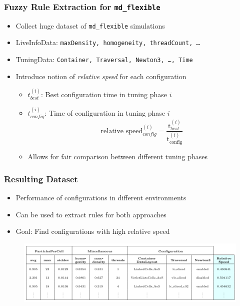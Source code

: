 \documentclass[
	10pt,
	t		%
]{beamer}
\begin{document}
\begin{frame}
	\frametitle{Fuzzy Rule Extraction for \texttt{md\_flexible}}

	\begin{itemize}
		\item Collect huge dataset of \texttt{md\_flexible} simulations
		\item LiveInfoData: {\small \texttt{maxDensity, homogeneity, threadCount, \dots} }
		\item TuningData: {\small \texttt{Container, Traversal, Newton3, \dots, Time} }
		\item Introduce notion of \textit{relative speed} for each configuration
		      \begin{itemize}
			      \item $t_{best}^{(i)}$: Best configuration time in tuning phase $i$
			      \item $t_{config}^{(i)}$: Time of configuration in tuning phase $i$
			            \[ \text{relative speed}_{config}^{(i)} = \frac{\text{t}_{best}^{(i)}}{\text{t}_{\text{config}}^{(i)}} \]
			      \item Allows for fair comparison between different tuning phases
		      \end{itemize}
	\end{itemize}

\end{frame}

\begin{frame}
	\frametitle{Resulting Dataset}

	\begin{itemize}
		\item Performance of configurations in different environments
		\item Can be used to extract rules for both approaches
		\item Goal: Find configurations with high relative speed
	\end{itemize}

	\begin{figure}
		\centering
		\includegraphics[width=1\textwidth]{figures/relative-speed-table.png}
	\end{figure}

\end{frame}
\end{document}
